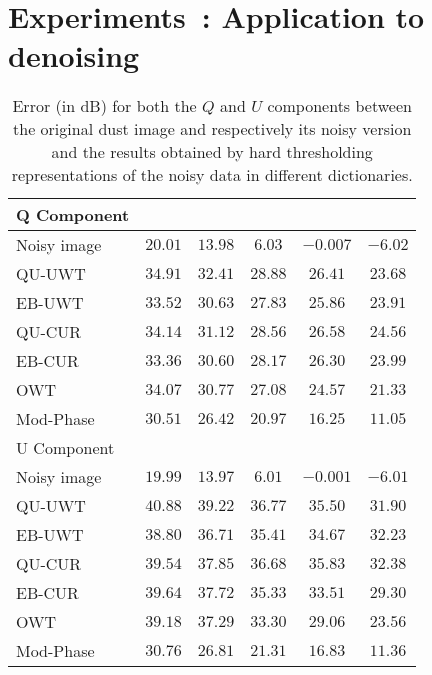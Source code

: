 \section{Experiments~: Application to denoising}
\label{sec:pol_denoising}

\begin{table}
\caption{ Error (in dB) for both the $Q$ and $U$ components between the original dust image and  respectively 
its noisy version and the results obtained by hard thresholding representations of the noisy data in different dictionaries.}
\begin{tabular}{l|ccccc}\hline
Q Component   &                    &  &  & &  \\      \hline
   Noisy image   & $20.01$    &   $13.98$   &   $6.03$     &   $-0.007$   &   $-6.02$   \\      \hline \hline
QU-UWT            &  $34.91$   &   $32.41$   &   $28.88$   &   $26.41$    &   $23.68$ \\
EB-UWT            &   $33.52$   &  $30.63$   &   $27.83$   &  $25.86$     &   $23.91$   \\
QU-CUR           &   $34.14$   &  $ 31.12$     &    $28.56$   &  $26.58$  &    $24.56$   \\
EB-CUR           &    $ 33.36$   &  $30.60$   &    $28.17$   &  $26.30$    &   $ 23.99$    \\   
OWT                   &   $34.07$   & $30.77$   &    $27.08$   &   $24.57$   &    $21.33$     \\    
Mod-Phase     &    $30.51$    & $26.42$  &     $20.97$   &    $16.25$  &   $11.05$  \\
\hline
U Component  &                 &  &  & &                \\      \hline
Noisy image   & $19.99$    &   $13.97$   &   $6.01$     &   $-0.001$      &   $-6.01$   \\      \hline  \hline
QU-UWT           &   $40.88$   &   $39.22$   &   $36.77$   &   $35.50$     &   $31.90$ \\
EB-UWT            &   $38.80$   &  $36.71$   &   $35.41$   &  $34.67$       &   $32.23$  \\
QU-CUR           &   $39.54$   &  $ 37.85$     &    $36.68$   &  $35.83$    & $32.38$     \\
EB-CUR            &    $39.64$   &  $ 37.72$   &    $35.33$   &  $33.51$    &  $29.30$    \\     
OWT                   &   $39.18$    & $37.29$   &    $33.30$   &   $29.06$   &    $23.56$   \\ 
Mod-Phase     &    $30.76$    & $26.81$  &     $21.31$   &    $16.83$  &   $11.36$  \\  \hline
\hline
\end{tabular}\label{tab_psnr_pol_dust}
\end{table}

